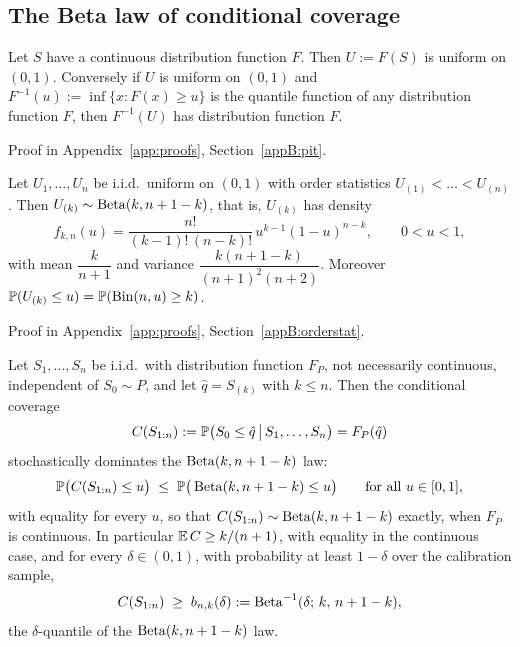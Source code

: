\documentclass[../../../main.tex]{subfiles}
\begin{document}
\subsection{The Beta law of conditional coverage}

\begin{lemma}\label{lem:prelim-pit}
Let $S$ have a continuous distribution function $F$. Then $U:=F(S)$ is uniform on $(0,1)$. Conversely if $U$ is uniform on $(0,1)$ and $F^{-1}(u):=\inf\{x:F(x)\ge u\}$ is the quantile function of any distribution function $F$, then $F^{-1}(U)$ has distribution function $F$.
\end{lemma}

Proof in Appendix~\ref{app:proofs}, Section~\ref{appB:pit}.

\begin{lemma}\label{lem:prelim-order-stat}
Let $U_1,\dots,U_n$ be i.i.d.\ uniform on $(0,1)$ with order statistics $U_{(1)}<\dots<U_{(n)}$. Then $U_{(k)}\sim\operatorname{Beta}(k,n+1-k)$, that is, $U_{(k)}$ has density
\begin{equation}\label{eq:prelim-beta-density}
f_{k,n}(u)=\frac{n!}{(k-1)!\,(n-k)!}\,u^{k-1}(1-u)^{n-k},\qquad 0<u<1,
\end{equation}
with mean $\dfrac{k}{n+1}$ and variance $\dfrac{k(n+1-k)}{(n+1)^2(n+2)}$. Moreover $\mathbb{P}(U_{(k)}\le u)=\mathbb{P}(\mathrm{Bin}(n,u)\ge k)$.
\end{lemma}

Proof in Appendix~\ref{app:proofs}, Section~\ref{appB:orderstat}.

\begin{theorem}\label{thm:prelim-beta}
Let $S_1,\dots,S_n$ be i.i.d.\ with distribution function $F_P$, not necessarily continuous, independent of $S_0\sim P$, and let $\hat q=S_{(k)}$ with $k\le n$. Then the conditional coverage
\[
C(S_{1:n}):=\mathbb{P}\big(S_0\le\hat q\,\big|\,S_1,\dots,S_n\big)=F_P(\hat q)
\]
stochastically dominates the $\operatorname{Beta}(k,n+1-k)$ law:
\[
\mathbb{P}\big(C(S_{1:n})\le u\big)\;\le\;\mathbb{P}\big(\operatorname{Beta}(k,n+1-k)\le u\big)\qquad\text{for all }u\in[0,1],
\]
with equality for every $u$, so that $C(S_{1:n})\sim\operatorname{Beta}(k,n+1-k)$ exactly, when $F_P$ is continuous. In particular $\mathbb{E}\,C\ge k/(n+1)$, with equality in the continuous case, and for every $\delta\in(0,1)$, with probability at least $1-\delta$ over the calibration sample,
\begin{equation}\label{eq:prelim-beta-quantile}
C(S_{1:n})\;\ge\;b_{n,k}(\delta):=\operatorname{Beta}^{-1}(\delta;\,k,\,n+1-k),
\end{equation}
the $\delta$-quantile of the $\operatorname{Beta}(k,n+1-k)$ law.
\end{theorem}
\end{document}
